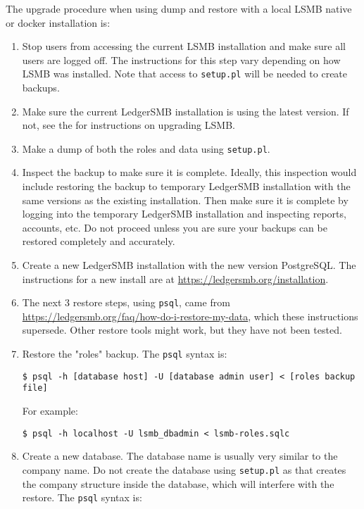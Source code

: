 The upgrade procedure when using dump and restore with a local LSMB native or docker installation  is:
\begin{enumerate}
    \item Stop users from accessing the current LSMB installation and make sure all users are logged off. 
        The instructions for this step vary depending on how LSMB was installed. 
        Note that access to \texttt{setup.pl} will be needed to create backups.
    \item Make sure the current LedgerSMB installation is using the latest version.  
        If not, see the  for instructions on upgrading LSMB.
    \item Make a dump of both the roles and data using \texttt{setup.pl}.
    \item Inspect the backup to make sure it is complete. 
        Ideally, this inspection would include restoring the backup to temporary LedgerSMB installation with the same versions as the existing installation.
        Then make sure it is complete by logging into the temporary LedgerSMB installation and inspecting reports, accounts, etc. 
        Do not proceed unless you are sure your backups can be restored completely and accurately.
    \item Create a new LedgerSMB installation with the new version PostgreSQL. 
        The instructions for a new install are at \url{https://ledgersmb.org/installation}.
    \item The next 3 restore steps, using \texttt{psql}, came from \url{https://ledgersmb.org/faq/how-do-i-restore-my-data}, which these instructions supersede. 
        Other restore tools might work, but they have not been tested.
    \item Restore the "roles" backup. The \texttt{psql} syntax is:
        
        \texttt{\$ psql -h [database host] -U [database admin user] < [roles backup file]}
        
        For example:
        
        \texttt{\$ psql -h localhost -U lsmb\_dbadmin < lsmb-roles.sqlc}
    \item Create a new database. 
        The database name is usually very similar to the company name. 
        Do not create the database using \texttt{setup.pl} as that creates the company structure inside the database, which will interfere with the restore.   The \texttt{psql} syntax is:


\end{enumerate}
